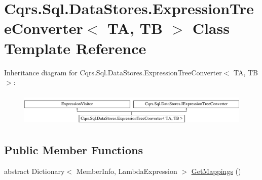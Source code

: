 \hypertarget{classCqrs_1_1Sql_1_1DataStores_1_1ExpressionTreeConverter}{}\section{Cqrs.\+Sql.\+Data\+Stores.\+Expression\+Tree\+Converter$<$ TA, TB $>$ Class Template Reference}
\label{classCqrs_1_1Sql_1_1DataStores_1_1ExpressionTreeConverter}
Inheritance diagram for Cqrs.\+Sql.\+Data\+Stores.\+Expression\+Tree\+Converter$<$ TA, TB $>$\+:\begin{figure}[H]
\begin{center}
\leavevmode
\includegraphics[height=1.618497cm]{classCqrs_1_1Sql_1_1DataStores_1_1ExpressionTreeConverter}
\end{center}
\end{figure}
\subsection*{Public Member Functions}
\begin{DoxyCompactItemize}
\item 
abstract Dictionary$<$ Member\+Info, Lambda\+Expression $>$ \hyperlink{classCqrs_1_1Sql_1_1DataStores_1_1ExpressionTreeConverter_abd0d906a5b8abd8520874104d3bfcad0_abd0d906a5b8abd8520874104d3bfcad0}{Get\+Mappings} ()
\end{DoxyCompactItemize}
